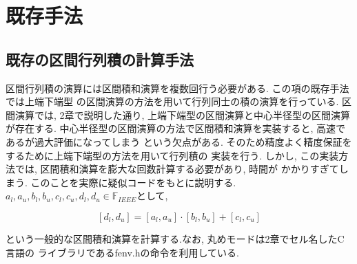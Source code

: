 \documentclass[11pt,a4paper]{jsreport}
\theoremstyle{definition}
\begin{document}
\chapter{既存手法}

\section{既存の区間行列積の計算手法}
  区間行列積の演算には区間積和演算を複数回行う必要がある. この項の既存手法では上端下端型
の区間演算の方法を用いて行列同士の積の演算を行っている.
  区間演算では, 2章で説明した通り, 上端下端型の区間演算と中心半径型の区間演算が存在する.
中心半径型の区間演算の方法で区間積和演算を実装すると, 高速であるが過大評価になってしまう
という欠点がある. そのため精度よく精度保証をするために上端下端型の方法を用いて行列積の
実装を行う. しかし, この実装方法では, 区間積和演算を膨大な回数計算する必要があり, 時間が
かかりすぎてしまう. このことを実際に疑似コードをもとに説明する.
$a_l,a_u,b_l,b_u,c_l,c_u,d_l,d_u \in \mathbb{F}_{IEEE}$として,

\begin{equation}
	\label{kison}
  [d_l,d_u] = [a_l,a_u] \cdot [b_l,b_u] + [c_l,c_u]
\end{equation}

という一般的な区間積和演算を計算する.なお, 丸めモードは2章でセル名したC言語の
ライブラリであるfenv.hの命令を利用している.
\end{document}
